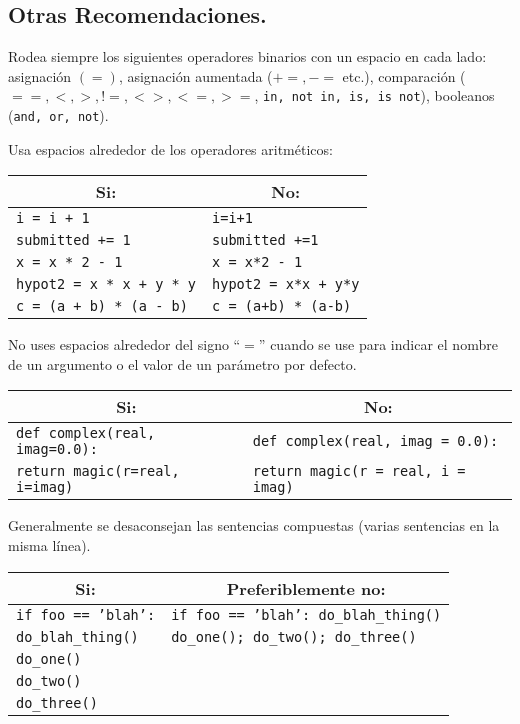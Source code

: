 \subsection{Otras Recomendaciones.}

Rodea siempre los siguientes operadores binarios con un espacio en cada lado: asignación $(=)$, asignación aumentada ($+=, -= $ etc.), comparación ($==, <, >, !=, <>, <=, >=$, \texttt{in, not in, is, is not}), booleanos (\texttt{and, or, not}).
\par
Usa espacios alrededor de los operadores aritméticos:
\begin{center}
\begin{tabular}{| l | l |}
\hline
\multicolumn{1}{|c|}{\textbf{Si:}} & \multicolumn{1}{c|}{\textbf{No:}} \\ \hline
\texttt{i = i + 1} & \texttt{i=i+1} \\
\texttt{submitted += 1} & \texttt{submitted +=1} \\
\texttt{x = x * 2 - 1} &  \texttt{x = x*2 - 1} \\
\texttt{hypot2 = x * x + y * y} &  \texttt{hypot2 = x*x + y*y} \\
\texttt{c = (a + b) * (a - b)} &  \texttt{c = (a+b) * (a-b)} \\ \hline
\end{tabular}
\end{center}
No uses espacios alrededor del signo \enquote{$=$} cuando se use para indicar el nombre de un argumento o el valor de un parámetro por defecto.
\begin{center}
\begin{tabular}{| l | l |}
\hline
\multicolumn{1}{|c|}{\textbf{Si:}} & \multicolumn{1}{c|}{\textbf{No:}} \\ \hline
\texttt{def complex(real, imag=0.0):} & \texttt{def complex(real, imag = 0.0):} \\
\texttt{\quad return magic(r=real, i=imag)} & \texttt{\quad return magic(r = real, i = imag)} \\ \hline
\end{tabular}
\end{center}
Generalmente se desaconsejan las sentencias compuestas (varias sentencias en la misma línea).
\begin{center}
\begin{tabular}{| l | l |}
\hline
\multicolumn{1}{|c|}{\textbf{Si:}} & \multicolumn{1}{c|}{\textbf{Preferiblemente no:}} \\ \hline
\texttt{if foo == 'blah':} & \texttt{if foo == 'blah': do\_blah\_thing()} \\
\texttt{\quad do\_blah\_thing()} & \texttt{do\_one(); do\_two(); do\_three()} \\
\texttt{do\_one()} & \\
\texttt{do\_two()} & \\
\texttt{do\_three()} & \\ \hline
\end{tabular}
\end{center}
